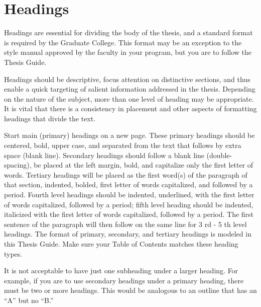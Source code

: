 \section{Headings}
Headings are essential for dividing the body of the thesis, and a standard format is required by the Graduate College. This format may be an exception to the style manual approved by the faculty in your program, but you are to follow the Thesis Guide.

Headings should be descriptive, focus attention on distinctive sections, and thus enable a quick targeting of salient information addressed in the thesis. Depending on the nature of the subject, more than one level of heading may be appropriate. It is vital that there is a consistency in placement and other aspects of formatting headings that divide the text.

Start main (primary) headings on a new page. These primary headings should be centered, bold, upper case, and separated from the text that follows by extra space (blank line). Secondary headings should follow a blank line (double-spacing), be placed at the left margin, bold, and capitalize only the first letter of words. Tertiary headings will be placed as the first word(s) of the paragraph of that section, indented, bolded, first letter of words capitalized, and followed by a period. Fourth level headings should be indented, underlined, with the first letter of words capitalized, followed by a period; fifth level heading should be indented, italicized with the first letter of words capitalized, followed by a period. The first sentence of the paragraph will then follow on the same line for 3 rd - 5 th level headings. The format of primary, secondary, and tertiary headings is modeled in this Thesis Guide. Make sure your Table of Contents matches these heading types.

It is not acceptable to have just one subheading under a larger heading. For example, if you are to use secondary headings under a primary heading, there must be two or more headings. This would be analogous to an outline that has an ``A'' but no ``B.''
